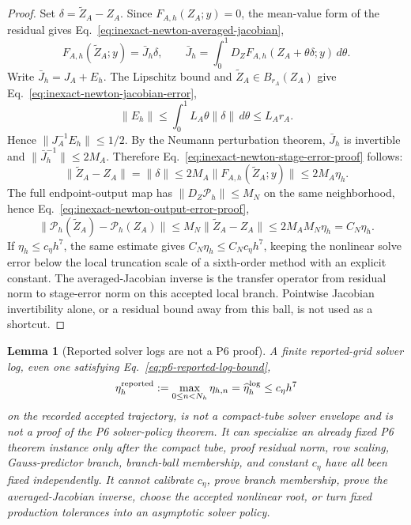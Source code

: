 \documentclass[preprint,12pt]{elsarticle}
\newtheorem{lemma}{Lemma}
\begin{document}
\begin{proof}
Set $\delta=\widetilde Z_A-Z_A$. Since $F_{A,h}(Z_A;y)=0$, the mean-value form
of the residual gives Eq.~\eqref{eq:inexact-newton-averaged-jacobian},
\begin{equation}
\label{eq:inexact-newton-averaged-jacobian}
  F_{A,h}(\widetilde Z_A;y)
   =\bar J_h\delta,\qquad
  \bar J_h=\int_0^1D_ZF_{A,h}(Z_A+\theta\delta;y)\,d\theta .
\end{equation}
Write $\bar J_h=J_A+E_h$. The Lipschitz bound and
$\widetilde Z_A\in B_{r_A}(Z_A)$ give
Eq.~\eqref{eq:inexact-newton-jacobian-error},
\begin{equation}
\label{eq:inexact-newton-jacobian-error}
  \|E_h\|
  \le \int_0^1 L_A\theta\|\delta\|\,d\theta
  \le L_A r_A .
\end{equation}
Hence $\|J_A^{-1}E_h\|\le 1/2$. By the Neumann perturbation theorem,
$\bar J_h$ is invertible and $\|\bar J_h^{-1}\|\le 2M_A$. Therefore
Eq.~\eqref{eq:inexact-newton-stage-error-proof} follows:
\begin{equation}
\label{eq:inexact-newton-stage-error-proof}
  \|\widetilde Z_A-Z_A\|
   =\|\delta\|
   \le 2M_A\|F_{A,h}(\widetilde Z_A;y)\|
   \le 2M_A\eta_h .
\end{equation}
The full endpoint-output map has \(\|D_Z\mathcal P_h\|\le M_N\) on the same
neighborhood, hence Eq.~\eqref{eq:inexact-newton-output-error-proof},
\begin{equation}
\label{eq:inexact-newton-output-error-proof}
  \|\mathcal P_h(\widetilde Z_A)-\mathcal P_h(Z_A)\|
  \le M_N\|\widetilde Z_A-Z_A\|
  \le 2M_AM_N\eta_h=C_N\eta_h .
\end{equation}
If \(\eta_h\le c_\eta h^7\), the same estimate gives
\(C_N\eta_h\le C_Nc_\eta h^7\), keeping the nonlinear solve error below the
local truncation scale of a sixth-order method with an explicit constant.
The averaged-Jacobian inverse is the transfer operator from residual norm to
stage-error norm on this accepted local branch. Pointwise Jacobian
invertibility alone, or a residual bound away from this ball, is not used as
a shortcut.
\end{proof}

\begin{lemma}[Reported solver logs are not a P6 proof]
\label{lem:p6-reported-log-nonclosure}
A finite reported-grid solver log, even one satisfying
Eq.~\eqref{eq:p6-reported-log-bound},
\begin{equation}
\label{eq:p6-reported-log-bound}
  \eta_h^{\rm reported}
  :=\max_{0\le n<N_h}\eta_{h,n}
  =\widehat\eta_h^{\rm log}\le c_\eta h^7
\end{equation}
on the recorded accepted trajectory, is not a compact-tube solver envelope
and is not a proof of the P6 solver-policy theorem.  It can specialize an
already fixed P6 theorem instance only after the compact tube, proof residual
norm, row scaling, Gauss-predictor branch, branch-ball membership, and
constant \(c_\eta\) have all been fixed independently.  It cannot calibrate
\(c_\eta\), prove branch membership, prove the averaged-Jacobian inverse,
choose the accepted nonlinear root, or turn fixed production tolerances into
an asymptotic solver policy.
\end{lemma}
\end{document}
